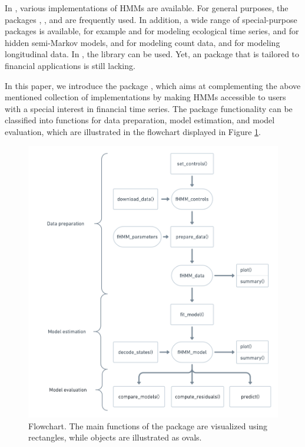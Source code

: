 \documentclass[article]{jss}
\begin{document}
In  \citep{r21}, various implementations of HMMs are available. For general purposes, the packages  \citep{him10},  \citep{vis10}, and  \citep{jac11} are frequently used. In addition, a wide range of special-purpose packages is available, for example  \citep{mic16} and  \citep{mcc18} for modeling ecological time series,  \citep{bul10} and  \citep{oco11} for hidden semi-Markov models,  \citep{tur14} and  \citep{ada19b} for modeling count data, and  \citep{bar17} for modeling longitudinal data. In , the library  \citep{leb22} can be used. Yet, an  package that is tailored to financial applications is still lacking.

In this paper, we introduce the  package  \citep{oel22}, which aims at complementing the above mentioned collection of implementations by making HMMs accessible to  users with a special interest in financial time series. The package functionality can be classified into functions for data preparation, model estimation, and model evaluation, which are illustrated in the flowchart displayed in Figure \ref{fig:flowchart}. 
\begin{figure}[t!]
  \includegraphics{flowchart.png}
  \caption{Flowchart. The main functions of the  package are visualized using rectangles, while objects are illustrated as ovals.}
  \label{fig:flowchart}
\end{figure}
\end{document}
